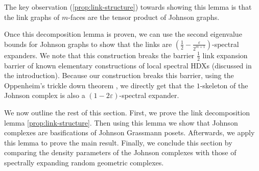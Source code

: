 \documentclass[10pt,a4paper]{article}
\newcommand{\prettyref}[1]{\cref{#1}}
\theoremstyle{definition}
\theoremstyle{remark}
\newcommand{\Authornotecolored}[3]{{\sffamily\small\color{#1}{[#2: #3]}}}
\newcommand{\Authornotecolored}[3]{}
\newcommand{\Ynote}{\Authornotecolored{Purple}{Y}}
\newcommand{\Snote}{\Authornotecolored{Green}{S}}
\newcommand{\snote}{\Snote}
\numberwithin{equation}{section}
\let\pref=\prettyref
\begin{document}
The key observation (\pref{prop:link-structure}) towards showing this lemma is that the link graphs of $m$-faces are the tensor product of Johnson graphs.

\snote{How does it sounds now?} \Ynote{I removed last sentence, because the definition made it obsolete. I also changed the sentence beforehand because we don't have Oppenheim's theorem in sec 2.1.1. but otherwise cool.}
Once this decomposition lemma is proven, we can use the second eigenvalue bounds for Johnson graphs to show that the links are $\left(\frac{1}{2}-\frac{\varepsilon}{2^{m+1}}\right)$-spectral expanders. We note that this construction breaks the barrier $\frac{1}{2}$ link expansion barrier of known elementary constructions of local spectral HDXs (discussed in the introduction). Because our construction breaks this barrier, using the Oppenheim's trickle down theorem \cite{oppenheim2018local}, we 
 directly get that the $1$-skeleton of the Johnson complex is also a $(1-2\varepsilon)$-spectral expander. %

We now outline the rest of this section. First, we prove the link decomposition lemma \pref{prop:link-structure}. Then using this lemma we show that Johnson complexes are basifications of Johnson Grassmann posets. Afterwards, we apply this lemma to prove the main result. Finally, we conclude this section by comparing the density parameters of the Johnson complexes with those of spectrally expanding random geometric complexes.

\end{document}
